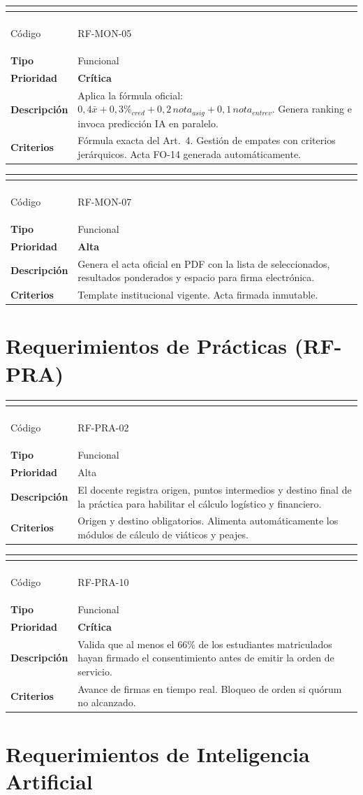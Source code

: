 \documentclass[12pt,a4paper,twoside]{report}
\newenvironment{reqenv}[2]{%
  \begin{longtable}{|>{\columncolor{rowGray}\bfseries\small}p{3.8cm}|>{\small}p{10.5cm}|}
  \hline
  \multicolumn{2}{|>{\columncolor{tableHdr}}c|}{\textcolor{white}{\textbf{#1 — #2}}} \\
  \hline \endfirsthead
  \hline
  \multicolumn{2}{|>{\columncolor{tableHdr}}c|}{\textcolor{white}{\textbf{#1 — #2 (Cont.)}}} \\
  \hline \endhead \hline
}{%
  \end{longtable}
}
\newcommand{\reqrow}[2]{#1 & #2 \\[2pt] \hline}
\begin{document}
\begin{reqenv}{RF-MON-05}{Algoritmo de Selección (Acuerdo 012/2023)}
\reqrow{Código}{RF-MON-05}
\reqrow{Tipo}{Funcional}
\reqrow{Prioridad}{\textcolor{uscoRed}{\textbf{Crítica}}}
\reqrow{Descripción}{Aplica la fórmula oficial: $0{,}4\bar{x} + 0{,}3\%_{cred} + 0{,}2\,nota_{asig} + 0{,}1\,nota_{entrev}$. Genera ranking e invoca predicción IA en paralelo.}
\reqrow{Criterios}{Fórmula exacta del Art.~4. Gestión de empates con criterios jerárquicos. Acta FO-14 generada automáticamente.}
\end{reqenv}

\begin{reqenv}{RF-MON-07}{Generación Automática de Acta FO-14}
\reqrow{Código}{RF-MON-07}
\reqrow{Tipo}{Funcional}
\reqrow{Prioridad}{\textcolor{uscoRed}{\textbf{Alta}}}
\reqrow{Descripción}{Genera el acta oficial en PDF con la lista de seleccionados, resultados ponderados y espacio para firma electrónica.}
\reqrow{Criterios}{Template institucional vigente. Acta firmada inmutable.}
\end{reqenv}

\section{Requerimientos de Prácticas (RF-PRA)}

\begin{reqenv}{RF-PRA-02}{Definición de Ruta Estructurada}
\reqrow{Código}{RF-PRA-02}
\reqrow{Tipo}{Funcional}
\reqrow{Prioridad}{Alta}
\reqrow{Descripción}{El docente registra origen, puntos intermedios y destino final de la práctica para habilitar el cálculo logístico y financiero.}
\reqrow{Criterios}{Origen y destino obligatorios. Alimenta automáticamente los módulos de cálculo de viáticos y peajes.}
\end{reqenv}

\begin{reqenv}{RF-PRA-10}{Verificación de Quórum del 66\%}
\reqrow{Código}{RF-PRA-10}
\reqrow{Tipo}{Funcional}
\reqrow{Prioridad}{\textcolor{uscoRed}{\textbf{Crítica}}}
\reqrow{Descripción}{Valida que al menos el 66\% de los estudiantes matriculados hayan firmado el consentimiento antes de emitir la orden de servicio.}
\reqrow{Criterios}{Avance de firmas en tiempo real. Bloqueo de orden si quórum no alcanzado.}
\end{reqenv}

\section{Requerimientos de Inteligencia Artificial}
\end{document}

